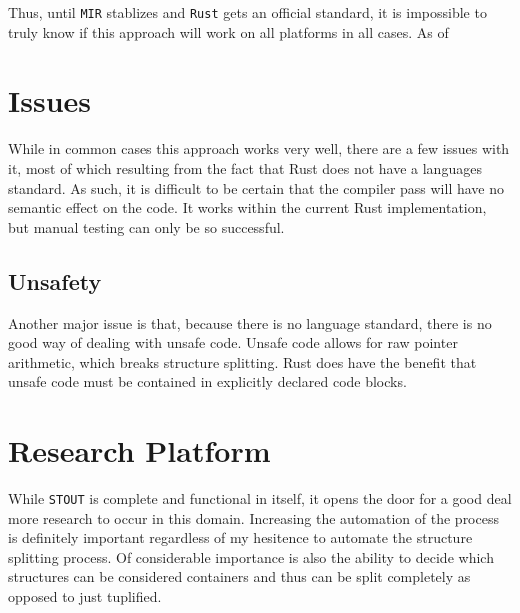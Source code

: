 \documentclass[12pt,oneside]{book}
\newcommand{\rustname}{{\texttt{Rust}}}
\def \rust {\rustname{}\xspace}
\newcommand{\mirname}{{\texttt{MIR}}}
\def \mir {\mirname{}\xspace}
\newcommand{\projectname}{{\texttt{STOUT}}}
\def \name{\projectname\xspace}
\begin{document}
Thus, until \mir stablizes and \rust gets an official standard, it is impossible
to truly know if this approach will work on all platforms in all cases. As of 

\chapter{Issues}

While in common cases this approach works very well, there are a few issues with
it, most of which resulting from the fact that Rust does not have a languages
standard. As such, it is difficult to be certain that the compiler pass will
have no semantic effect on the code. It works within the current Rust
implementation, but manual testing can only be so successful.


\section{Unsafety}
\label{sec:unsafe}


Another major issue is that, because there is no language standard, there is no
good way of dealing with unsafe code. Unsafe code allows for raw pointer
arithmetic, which breaks structure splitting. Rust does have the benefit that
unsafe code must be contained in explicitly declared code blocks.

\chapter{Research Platform}

While \name is complete and functional in itself, it opens the door for 
a good deal more research to occur in this domain. Increasing the automation
of the process is definitely important regardless of my hesitence to automate
the structure splitting process. Of considerable importance is also
the ability to decide which structures can be considered containers and thus 
can be split completely as opposed to just tuplified.



\end{document}
